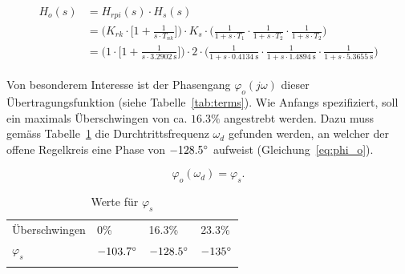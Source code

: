 \begin{gather} \label{eq:pi:h_open}
    \begin{split}
        H_o (s) & = H_{rpi} (s) \cdot H_s (s) \\
            & = \Biggl(
                    K_{rk} \cdot \biggl[ 1 + \frac{1}{s \cdot T_{nk}} \biggr]
                \Biggr)
                \cdot
                K_s
                \cdot
                \Biggl(
                        \frac{1}{1 + s \cdot T_1}
                  \cdot \frac{1}{1 + s \cdot T_2}
                  \cdot \frac{1}{1 + s \cdot T_2}
                \Biggr) \\
            & = \Biggl(
                    1 \cdot \biggl[ 1 + \frac{1}{s \cdot \SI{3.2902}{\second}} \biggr]
                \Biggr)
                \cdot
                2
                \cdot
                \Biggl(
                          \frac{1}{1 + s \cdot \SI{0.4134}{\second}}
                    \cdot \frac{1}{1 + s \cdot \SI{1.4894}{\second}}
                    \cdot \frac{1}{1 + s \cdot \SI{5.3655}{\second}}
                \Biggr)
    \end{split}
\end{gather}


Von   besonderem    Interesse   ist   der    Phasengang   $\varphi_o(j\omega)$
dieser  \"Ubertragungsfunktion  (siehe  Tabelle~\ref{tab:terms}). Wie  Anfangs
spezifiziert, soll  ein maximals  \"Uberschwingen von  ca. $16.3\%$ angestrebt
werden. Dazu  muss  gem\"ass Tabelle~\ref{tab:phi_s}  die  Durchtrittsfrequenz
$\omega_d$ gefunden  werden, an welcher  der offene Regelkreis eine  Phase von
$-128.5\degree$ aufweist (Gleichung~\ref{eq:phi_o}).

\begin{equation} \label{eq:phi_o}
    \varphi_o(\omega_d)=\varphi_s.
\end{equation}

\begin{longtable}{llll}
    \toprule
    \endhead
    \endfoot
    \endlastfoot


    \"Uberschwingen & 0\%              & 16.3\%           & 23.3\% \\
    $\varphi_s$        & $-103.7 \degree$ & $-128.5 \degree$ & $-135 \degree$ \\

    \bottomrule
    \caption{Werte f\"ur $\varphi_s$}
    \label{tab:phi_s}
\end{longtable}


